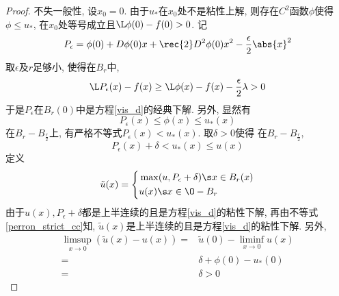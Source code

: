 \begin{proof}
    不失一般性, 设$x_0=0$. 由于$u_*$在$x_0$处不是粘性上解, 则存在$C^2$函数$\phi$使得 $\phi \le u_*$, 在$x_0$处等号成立且$\L \phi(0)-f(0)>0$. 记
    \begin{equation}
        P_\epsilon=\phi(0)+D\phi(0)x+\rec{2}D^2\phi(0)x^2-\frac{\epsilon}{2}\abs{x}^2
    \end{equation}
    取$\epsilon$及$r$足够小, 使得在$B_r$中,
    \begin{equation}
        \L P_\epsilon(x) -f(x) \ge \L \phi(x) - f(x) - \frac{\epsilon}{2} \lambda >0
    \end{equation}
    于是$P_\epsilon$在$B_r(0)$中是方程\eqref{vis_d}的经典下解.  另外, 显然有
    \begin{equation}
        P_\epsilon(x) \le \phi(x) \le u_*(x)
    \end{equation}
    在$B_r-B_{\frac{r}{2}}$上, 有严格不等式$P_\epsilon(x) < u_*(x)$. 取$\delta >0$使得 在$B_r-B_{\frac{r}{2}}$, 
    \begin{equation} \label{perron_strict_cc}
        P_\epsilon(x)+\delta < u_*(x) \le u(x)
    \end{equation}
    定义
    \begin{equation}
        \tilde{u}(x)=\left\{
            \begin{aligned}
                & \max (u, P_\epsilon+\delta) \s x \in B_r(x) \\
                & u(x) \s x \in \O-B_r
            \end{aligned}
        \right.
    \end{equation}
    由于$u(x), P_\epsilon+\delta$都是上半连续的且是方程\eqref{vis_d}的粘性下解, 再由不等式\eqref{perron_strict_cc}知, $\tilde{u}(x)$是上半连续的且是方程\eqref{vis_d}的粘性下解. 另外, 
    \begin{equation}
        \begin{split}
            \limsup_{x\to 0} (\tilde{u}(x)-u(x)) = & \tilde{u}(0)-\liminf_{x\to 0} u(x) \\
            =& \delta + \phi(0)-u_*(0)\\
            =&\delta >0
        \end{split}
    \end{equation}
\end{proof}
